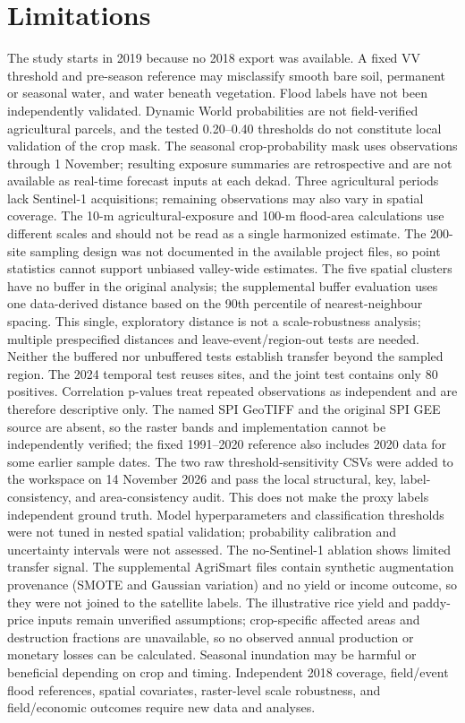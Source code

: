\documentclass[pdflatex,sn-mathphys,Numbered]{sn-jnl}
\begin{document}
\section{Limitations}
The study starts in 2019 because no 2018 export was available. A fixed VV threshold and pre-season reference may misclassify smooth bare soil, permanent or seasonal water, and water beneath vegetation. Flood labels have not been independently validated. Dynamic World probabilities are not field-verified agricultural parcels, and the tested 0.20--0.40 thresholds do not constitute local validation of the crop mask. The seasonal crop-probability mask uses observations through 1 November; resulting exposure summaries are retrospective and are not available as real-time forecast inputs at each dekad. Three agricultural periods lack Sentinel-1 acquisitions; remaining observations may also vary in spatial coverage. The 10-m agricultural-exposure and 100-m flood-area calculations use different scales and should not be read as a single harmonized estimate. The 200-site sampling design was not documented in the available project files, so point statistics cannot support unbiased valley-wide estimates. The five spatial clusters have no buffer in the original analysis; the supplemental buffer evaluation uses one data-derived distance based on the 90th percentile of nearest-neighbour spacing. This single, exploratory distance is not a scale-robustness analysis; multiple prespecified distances and leave-event/region-out tests are needed. Neither the buffered nor unbuffered tests establish transfer beyond the sampled region. The 2024 temporal test reuses sites, and the joint test contains only 80 positives. Correlation p-values treat repeated observations as independent and are therefore descriptive only. The named SPI GeoTIFF and the original SPI GEE source are absent, so the raster bands and implementation cannot be independently verified; the fixed 1991--2020 reference also includes 2020 data for some earlier sample dates. The two raw threshold-sensitivity CSVs were added to the workspace on 14 November 2026 and pass the local structural, key, label-consistency, and area-consistency audit. This does not make the proxy labels independent ground truth. Model hyperparameters and classification thresholds were not tuned in nested spatial validation; probability calibration and uncertainty intervals were not assessed. The no-Sentinel-1 ablation shows limited transfer signal. The supplemental AgriSmart files contain synthetic augmentation provenance (SMOTE and Gaussian variation) and no yield or income outcome, so they were not joined to the satellite labels. The illustrative rice yield and paddy-price inputs remain unverified assumptions; crop-specific affected areas and destruction fractions are unavailable, so no observed annual production or monetary losses can be calculated. Seasonal inundation may be harmful or beneficial depending on crop and timing. Independent 2018 coverage, field/event flood references, spatial covariates, raster-level scale robustness, and field/economic outcomes require new data and analyses.
\end{document}
